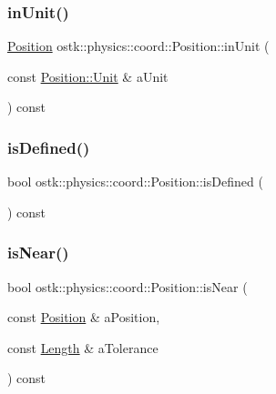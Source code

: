 \mbox{\label{classostk_1_1physics_1_1coord_1_1_position_a91baafa3dbbd48de681204c1c437ea35}} 
\subsubsection{\texorpdfstring{in\+Unit()}{inUnit()}}
{\footnotesize\ttfamily \hyperlink{classostk_1_1physics_1_1coord_1_1_position}{Position} ostk\+::physics\+::coord\+::\+Position\+::in\+Unit (\begin{DoxyParamCaption}\item[{const \hyperlink{classostk_1_1physics_1_1units_1_1_length_a2664470a7eedf5d45c88861fe69badea}{Position\+::\+Unit} \&}]{a\+Unit }\end{DoxyParamCaption}) const}

\mbox{\label{classostk_1_1physics_1_1coord_1_1_position_a969585edcf7795bbb6f4e62a10b2885b}} 
\subsubsection{\texorpdfstring{is\+Defined()}{isDefined()}}
{\footnotesize\ttfamily bool ostk\+::physics\+::coord\+::\+Position\+::is\+Defined (\begin{DoxyParamCaption}{ }\end{DoxyParamCaption}) const}

\mbox{\label{classostk_1_1physics_1_1coord_1_1_position_a74cd31785d720561076b9f277d008dae}} 
\subsubsection{\texorpdfstring{is\+Near()}{isNear()}}
{\footnotesize\ttfamily bool ostk\+::physics\+::coord\+::\+Position\+::is\+Near (\begin{DoxyParamCaption}\item[{const \hyperlink{classostk_1_1physics_1_1coord_1_1_position}{Position} \&}]{a\+Position,  }\item[{const \hyperlink{classostk_1_1physics_1_1units_1_1_length}{Length} \&}]{a\+Tolerance }\end{DoxyParamCaption}) const}

